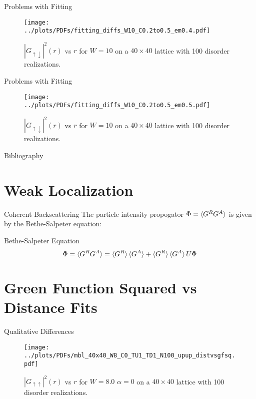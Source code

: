 \documentclass[]{beamer}
\begin{document}
\begin{frame}{Problems with Fitting}
    \begin{figure}
        \centering
        \texttt{[image: ../plots/PDFs/fitting\_diffs\_W10\_C0.2to0.5\_em0.4.pdf]}
        \caption{$|G_{\uparrow\downarrow}|^2(r)$ vs $r$ for $W = 10$ on a $40\times40$ lattice with 100 disorder realizations.}
    \end{figure}        
\end{frame}

\begin{frame}{Problems with Fitting}
    \begin{figure}
        \centering
        \texttt{[image: ../plots/PDFs/fitting\_diffs\_W10\_C0.2to0.5\_em0.5.pdf]}
        \caption{$|G_{\uparrow\downarrow}|^2(r)$ vs $r$ for $W = 10$ on a $40\times40$ lattice with 100 disorder realizations.}
    \end{figure}        
\end{frame}


\begin{frame}[allowframebreaks]{Bibliography}
    \tiny{\printbibliography}
\end{frame}

\appendix

\section{Weak Localization}
\begin{frame}{Coherent Backscattering}
    The particle intensity propogator $\Phi = \braket{G^R
    G^A}$ is given by the Bethe-Salpeter equation:
    \begin{block}{Bethe-Salpeter Equation}
        \[
            \Phi = \braket{G^R G^A} = \braket{G^R}\braket{G^A}
            + \braket{G^R}\braket{G^A}U\Phi
        \]
    \end{block}
\end{frame}

\section{Green Function Squared vs Distance Fits}
\begin{frame}{Qualitative Differences}
    \begin{figure}
        \centering
        \texttt{[image: ../plots/PDFs/mbl\_40x40\_W8\_C0\_TU1\_TD1\_N100\_upup\_distvsgfsq.pdf]}
        \caption{$|G_{\uparrow\uparrow}|^2(r)$ vs $r$ for $W = 8.0$ $\alpha = 0$ on a $40\times40$
                lattice with 100 disorder realizations.}
    \end{figure}        
\end{frame}
\end{document}
